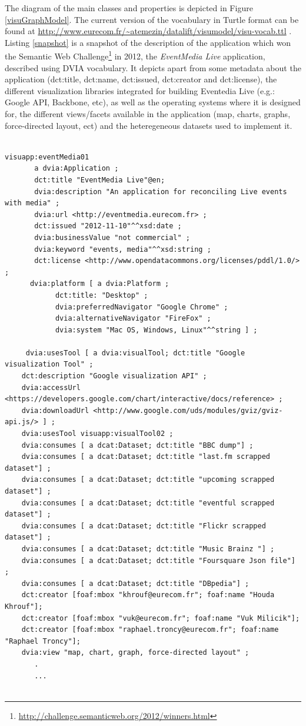The diagram of the main classes and properties is depicted in Figure \ref{visuGraphModel}. The current version of the vocabulary in Turtle format can be found at \url{http://www.eurecom.fr/~atemezin/datalift/visumodel/visu-vocab.ttl} .  Listing \ref{snapshot} is a snapshot of the description of the application which won the Semantic Web Challenge\footnote{\url{http://challenge.semanticweb.org/2012/winners.html}} in 2012, the \textit{EventMedia Live} application, described using DVIA vocabulary. It depicts apart from some metadata about the application (dct:title, dct:name, dct:issued, dct:creator and dct:license), the different visualization libraries integrated for building Eventedia Live (e.g.: Google API, Backbone, etc), as well as the operating systems where it is designed for, the different views/facets available in the application (map, charts, graphs, force-directed layout, ect) and the heteregeneous datasets used to implement it. 
\begin{lstlisting}

visuapp:eventMedia01
       a dvia:Application ; 
       dct:title "EventMedia Live"@en;   
       dvia:description "An application for reconciling Live events with media" ; 
       dvia:url <http://eventmedia.eurecom.fr> ; 
       dct:issued "2012-11-10"^^xsd:date ; 
       dvia:businessValue "not commercial" ;   
       dvia:keyword "events, media"^^xsd:string ; 
       dct:license <http://www.opendatacommons.org/licenses/pddl/1.0/> ; 
      dvia:platform [ a dvia:Platform ; 
			dct:title: "Desktop" ;
			dvia:preferredNavigator "Google Chrome" ; 
			dvia:alternativeNavigator "FireFox" ;
			dvia:system "Mac OS, Windows, Linux"^^string ] ; 
		
     dvia:usesTool [ a dvia:visualTool; dct:title "Google visualization Tool" ; 
	dct:description "Google visualization API" ; 
	dvia:accessUrl <https://developers.google.com/chart/interactive/docs/reference> ; 
	dvia:downloadUrl <http://www.google.com/uds/modules/gviz/gviz-api.js/> ] ;
    dvia:usesTool visuapp:visualTool02 ;
    dvia:consumes [ a dcat:Dataset; dct:title "BBC dump"] ; 
    dvia:consumes [ a dcat:Dataset; dct:title "last.fm scrapped dataset"] ;
    dvia:consumes [ a dcat:Dataset; dct:title "upcoming scrapped dataset"] ;
    dvia:consumes [ a dcat:Dataset; dct:title "eventful scrapped dataset"] ;
    dvia:consumes [ a dcat:Dataset; dct:title "Flickr scrapped dataset"] ;
    dvia:consumes [ a dcat:Dataset; dct:title "Music Brainz "] ;
    dvia:consumes [ a dcat:Dataset; dct:title "Foursquare Json file"] ;
    dvia:consumes [ a dcat:Dataset; dct:title "DBpedia"] ;
    dct:creator [foaf:mbox "khrouf@eurecom.fr"; foaf:name "Houda Khrouf"];
    dct:creator [foaf:mbox "vuk@eurecom.fr"; foaf:name "Vuk Milicik"];
    dct:creator [foaf:mbox "raphael.troncy@eurecom.fr"; foaf:name "Raphael Troncy"];
    dvia:view "map, chart, graph, force-directed layout" ; 
       .
	   ...
	
\end{lstlisting}

